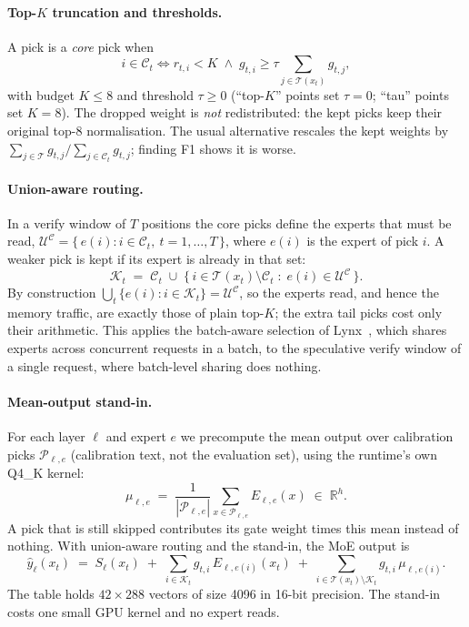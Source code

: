 \documentclass[11pt]{article}
\begin{document}
\paragraph{Top-$K$ truncation and thresholds.} A pick is a \emph{core} pick when
\begin{equation}
  i \in \mathcal{C}_t \iff r_{t,i} < K \;\wedge\; g_{t,i} \ge \tau \sum_{j\in\mathcal{T}(x_t)} g_{t,j},
  \label{eq:core}
\end{equation}
with budget $K \le 8$ and threshold $\tau \ge 0$ (``top-$K$'' points set $\tau = 0$; ``tau'' points set $K = 8$). The
dropped weight is \emph{not} redistributed: the kept picks keep their original top-8 normalisation. The usual alternative
rescales the kept weights by $\sum_{j\in\mathcal{T}} g_{t,j} / \sum_{j\in\mathcal{C}_t} g_{t,j}$; finding F1 shows it is
worse.

\paragraph{Union-aware routing.} In a verify window of $T$ positions the core picks define the experts that must be
read, $\mathcal{U}^{\mathcal{C}} = \{\,e(i) : i \in \mathcal{C}_t,\ t = 1,\dots,T\,\}$, where $e(i)$ is the expert of pick
$i$. A weaker pick is kept if its expert is already in that set:
\begin{equation}
  \mathcal{K}_t \;=\; \mathcal{C}_t \;\cup\; \{\, i \in \mathcal{T}(x_t) \setminus \mathcal{C}_t \;:\; e(i) \in \mathcal{U}^{\mathcal{C}} \,\}.
  \label{eq:union}
\end{equation}
By construction $\bigcup_t \{e(i) : i\in\mathcal{K}_t\} = \mathcal{U}^{\mathcal{C}}$, so the experts read, and hence the
memory traffic, are exactly those of plain top-$K$; the extra tail picks cost only their arithmetic. This applies the
batch-aware selection of Lynx~\citep{lynx}, which shares experts across concurrent requests in a batch, to the speculative
verify window of a single request, where batch-level sharing does nothing.

\paragraph{Mean-output stand-in.} For each layer $\ell$ and expert $e$ we precompute the mean output over calibration
picks $\mathcal{P}_{\ell,e}$ (calibration text, not the evaluation set), using the runtime's own Q4\_K kernel:
\begin{equation}
  \mu_{\ell,e} \;=\; \frac{1}{|\mathcal{P}_{\ell,e}|}\sum_{x\in\mathcal{P}_{\ell,e}} E_{\ell,e}(x) \;\in\; \mathbb{R}^{h}.
  \label{eq:mean}
\end{equation}
A pick that is still skipped contributes its gate weight times this mean instead of nothing. With union-aware routing and
the stand-in, the MoE output is
\begin{equation}
  \hat y_\ell(x_t) \;=\; S_\ell(x_t) \;+\; \sum_{i\in\mathcal{K}_t} g_{t,i}\,E_{\ell,e(i)}(x_t)
  \;+\; \sum_{i\in\mathcal{T}(x_t)\setminus\mathcal{K}_t} g_{t,i}\,\mu_{\ell,e(i)} .
  \label{eq:standin}
\end{equation}
The table holds $42 \times 288$ vectors of size 4096 in 16-bit precision. The stand-in costs one small GPU kernel and no
expert reads.
\end{document}

